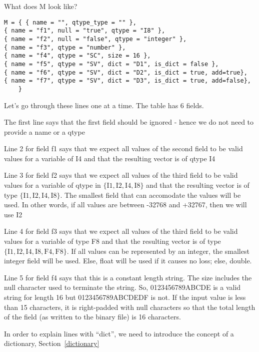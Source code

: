 \documentclass[letterpaper]{article}
\begin{document}
What does M look like?
\begin{verbatim}
M = { { name = "", qtype_type = "" },
{ name = "f1", null = "true", qtype = "I8" },
{ name = "f2", null = "false", qtype = "integer" },
{ name = "f3", qtype = "number" },
{ name = "f4", qtype = "SC", size = 16 },
{ name = "f5", qtype = "SV", dict = "D1", is_dict = false }, 
{ name = "f6", qtype = "SV", dict = "D2", is_dict = true, add=true},
{ name = "f7", qtype = "SV", dict = "D3", is_dict = true, add=false},
    }
\end{verbatim}

Let's go through these lines one at a time. The table has 6 fields.

\be
\item 
The first line says that the first field should be ignored - hence we
do not need to provide a name or a qtype
\item 
Line 2 for field f1 says that we expect all values of the second field to
be valid values for a variable of I4 and that the 
resulting vector is of qtype I4

\item 
Line 3 for field f2  says that we expect all values of the third field to
be valid values for a variable of qtype in 
\(\{\mathrm{I1, I2, I4, I8}\}\)
and that the
resulting vector is of type
\(\{\mathrm{I1, I2, I4, I8}\}\).
The smallest field that
can accomodate the values will be used. In other words, if all values are
between -32768 and +32767, then we will use I2
\item 
Line 4 for field f3 says that we expect all values of the third field to
be valid values for a variable of type F8 and that the resulting
vector is of type
\(\{\mathrm{I1, I2, I4, I8, F4, F8}\}\).
If all values
can be represented by an integer, the smallest integer field will be
used. Else, float will be used if it causes no loss; else, double.
\item Line 5 for field f4 says that this is a constant length string. The size
  includes the null character used to terminate the string. So, 0123456789ABCDE
  is a valid string for length 16 but 0123456789ABCDEDF is not. If the input
  value is less than 15 characters, it is right-padded with null characters so that
  the total length of the field (as written to the binary file) is 16
  characters. 

\item 
In order to explain lines with ``dict'', we need to introduce the concept of
a dictionary, Section~\ref{dictionary}
\ee
\end{document}
